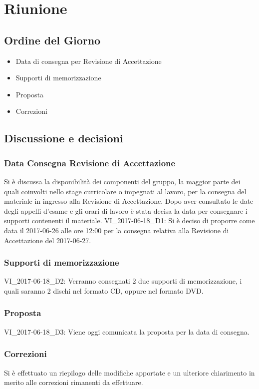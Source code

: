 \section{Riunione}
\subsection{Ordine del Giorno}
\begin{itemize}
	\item Data di consegna per Revisione di Accettazione
	\item Supporti di memorizzazione
	\item Proposta
	\item Correzioni
\end{itemize}

\subsection{Discussione e decisioni}

\subsubsection{Data Consegna Revisione di Accettazione}
Si è discussa la disponibilità dei componenti del gruppo, la maggior parte dei quali coinvolti nello stage curricolare o impegnati al lavoro, per la consegna del materiale in ingresso alla Revisione di Accettazione. Dopo aver consultato le date degli appelli d'esame e gli orari di lavoro è stata decisa la data per consegnare i supporti contenenti il materiale. 
VI\_2017-06-18\_D1: Si è deciso di proporre come data il 2017-06-26 alle ore 12:00 per la consegna relativa alla Revisione di Accettazione del 2017-06-27. 

\subsubsection{Supporti di memorizzazione}
VI\_2017-06-18\_D2: Verranno consegnati 2 due supporti di memorizzazione, i quali saranno 2 dischi nel formato CD, oppure nel formato DVD.

\subsubsection{Proposta}
VI\_2017-06-18\_D3: Viene oggi comunicata la proposta per la data di consegna.

\subsubsection{Correzioni}
Si è effettuato un riepilogo delle modifiche apportate e un ulteriore chiarimento in merito alle correzioni rimanenti da effettuare.


\clearpage
